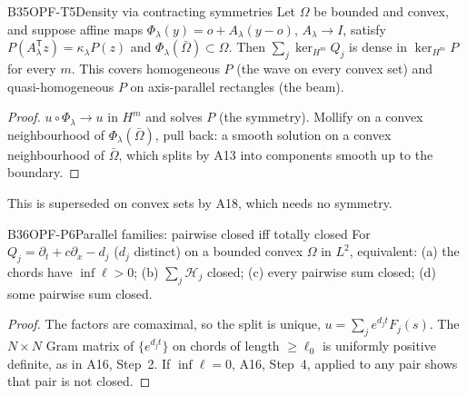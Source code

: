 \begin{dimcard}{B35}{OPF-T5}{Density via contracting symmetries}{\pw}{}
Let $\Omega$ be bounded and convex, and suppose affine maps $\Phi_\lambda(y)=o+A_\lambda(y-o)$, $A_\lambda\to I$, satisfy $P(A_\lambda^{\mathsf T}z)=\kappa_\lambda P(z)$ and $\Phi_\lambda(\bar\Omega)\subset\Omega$. Then $\sum_j\ker_{H^m}Q_j$ is dense in $\ker_{H^m}P$ for every $m$. This covers homogeneous $P$ (the wave on every convex set) and quasi-homogeneous $P$ on axis-parallel rectangles (the beam).
\end{dimcard}
\begin{proof}
$u\circ\Phi_\lambda\to u$ in $H^m$ and solves $P$ (the symmetry). Mollify on a convex neighbourhood of $\Phi_\lambda(\bar\Omega)$, pull back: a smooth solution on a convex neighbourhood of $\bar\Omega$, which splits by A13 into components smooth up to the boundary.
\end{proof}

This is superseded on convex sets by A18, which needs no symmetry.

\begin{dimcard}{B36}{OPF-P6}{Parallel families: pairwise closed iff totally closed}{\pw}{}
For $Q_j=\partial_t+c\partial_x-d_j$ ($d_j$ distinct) on a bounded convex $\Omega$ in $L^2$, equivalent: (a) the chords have $\inf\ell>0$; (b) $\sum_j\mathcal H_j$ closed; (c) every pairwise sum closed; (d) some pairwise sum closed.
\end{dimcard}
\begin{proof}
The factors are comaximal, so the split is unique, $u=\sum_je^{d_jt}F_j(s)$.
The $N\times N$ Gram matrix of $\{e^{d_jt}\}$ on chords of length $\ge\ell_0$ is uniformly positive definite, as in A16, Step~2.
If $\inf\ell=0$, A16, Step~4, applied to any pair shows that pair is not closed.
\end{proof}

